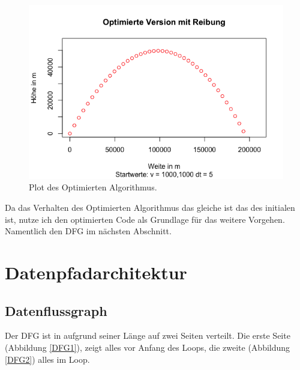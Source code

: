 \documentclass{article}
\begin{document}
    \begin{figure}[!htbp]
        \includegraphics[width=\textwidth]{../Ballistiken/PlotExports/Optimiert.png}
        \caption{Plot des Optimierten Algorithmus.}
        \label{Ortsplot initial}
    \end{figure}

    Da das Verhalten des Optimierten Algorithmus das gleiche ist das des initialen ist, nutze ich den
    optimierten Code als Grundlage für das weitere Vorgehen. Namentlich den DFG im nächsten Abschnitt.


    \section{Datenpfadarchitektur}

    \subsection{Datenflussgraph}

    Der DFG ist in aufgrund seiner Länge auf zwei Seiten verteilt.
    Die erste Seite (Abbildung \ref{DFG1}), zeigt alles vor Anfang des Loops,
    die zweite (Abbildung \ref{DFG2}) alles im Loop.
\end{document}
